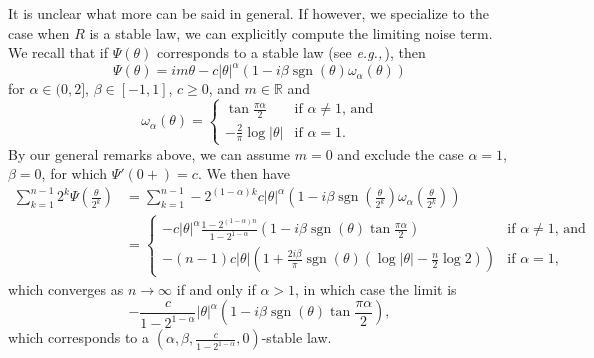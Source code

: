 \documentclass{article}
\newcommand{\eg}{\textit{e.g.,}\,}
\newcommand{\1}{\mathbbm{1}}
\DeclareMathOperator*{\sgn}{sgn}
\theoremstyle{remark}
\theoremstyle{definition}
\begin{document}
It is unclear what more can be said in general. If however, we specialize to the case when $R$ is a stable law, we can explicitly compute the limiting noise term.  We recall that if $\Psi(\theta)$ corresponds to a stable law (see \eg \cite{breiman1992probability}), then
\[
	\Psi(\theta) = im\theta - c|\theta|^{\alpha} (1-i\beta \sgn(\theta)\omega_{\alpha}(\theta))
\]
for $\alpha \in (0,2]$, $\beta \in [-1,1]$, $c \geq 0$, and $m \in \mathbb{R}$ and
\[
	\omega_{\alpha}(\theta) = \begin{cases}
		\tan{\frac{\pi\alpha}{2}} & \text{if $\alpha \neq 1$, and}\\
		-\frac{2}{\pi}\log{|\theta|} & \text{if $\alpha = 1$.}
	\end{cases}
\]
By our general remarks above, we can assume $m = 0$ and exclude the case $\alpha = 1$, $\beta = 0$, for which  $\Psi'(0+) = c$. We then have
\begin{align*}
	 \sum_{k=1}^{n-1}  {\textstyle 2^{k} \Psi\left(\frac{\theta}{2^{k}}\right)}
	 &=  \sum_{k=1}^{n-1} -2^{(1-\alpha)k} c|\theta|^{\alpha} {\textstyle\left(1-i \beta\sgn\left(\frac{\theta}{2^{k}}\right)
	 	 \omega_{\alpha}\left(\frac{\theta}{2^{k}}\right)\right)}\\
	&= \begin{cases}
		 -c|\theta|^{\alpha}\frac{1-2^{(1-\alpha)n}}{1-2^{1-\alpha}}\left(1-i\beta \sgn(\theta) \tan{\frac{\pi\alpha}{2}}\right) & \text{if $\alpha \neq 1$, and}\\	
         -(n-1) c|\theta| \left(1+\frac{2i\beta}{\pi}\sgn(\theta)\left(\log{|\theta|} - \frac{n}{2} \log{2}\right)\right) & \text{if $\alpha = 1$,}
	\end{cases}
\end{align*}
which converges as $n \to \infty$ if and only if $\alpha > 1$, in which case the limit is 
\begin{equation}\label{eq:stablenoises}
	 -\frac{c}{1-2^{1-\alpha}}|\theta|^{\alpha}\left(1-i\beta \sgn(\theta) \tan{\frac{\pi\alpha}{2}}\right), 
\end{equation}
which corresponds to a $\left(\alpha,\beta, \frac{c}{1-2^{1-\alpha}},0\right)$-stable law.
\end{document}
